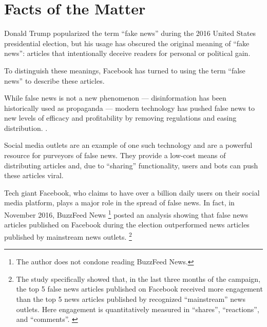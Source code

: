 

\section{Facts of the Matter}

\par Donald Trump popularized the term ``fake news'' during the 2016 United States presidential election, \cite{tc_what_is_fake_news} but his usage has obscured the original meaning of ``fake news'': articles that intentionally deceive readers for personal or political gain. \cite{tc_what_is_fake_news, npr_fake_news}

\par To distinguish these meanings, Facebook has turned to using the term ``false news'' to describe these articles. \cite{fb_spot_fake_news}

\par While false news is not a new phenomenon --- disinformation has been historically used as propaganda \cite{bbc_fn_propaganda} --- modern technology has pushed false news to new levels of efficacy and profitability by removing regulations and easing distribution. \cite{telegraph_fake_news}.

\par Social media outlets are an example of one such technology and are a powerful resource for purveyors of false news. They provide a low-cost means of distributing articles and, due to ``sharing'' functionality, users and bots can push these articles viral. \cite{cbs_fake_news}

\par Tech giant Facebook, who claims to have over a billion daily users on their social media platform, plays a major role in the spread of false news. \cite{cbs_fake_news} In fact, in November 2016, BuzzFeed News \footnote{The author does not condone reading BuzzFeed News.} posted an analysis showing that false news articles published on Facebook during the election outperformed news articles published by mainstream news outlets. \footnote{The study specifically showed that, in the last three months of the campaign, the top 5 false news articles published on Facebook received more engagement than the top 5 news articles published by recognized ``mainstream'' news outlets. Here engagement is quantitatively measured in ``shares'', ``reactions'', and ``comments''. \cite{buzzfeed_news_analysis}} \cite{buzzfeed_news_analysis}

